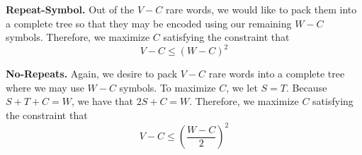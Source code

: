 \noindent\textbf{Repeat-Symbol.}
Out of the $V - C$ rare words, we would like to pack them into a complete tree
so that they may be encoded using our remaining $W - C$ symbols. Therefore, we
maximize $C$ satisfying the constraint that
$$V - C \leq (W - C)^{2}$$

\noindent\textbf{No-Repeats.}
Again, we desire to pack $V - C$ rare words into a complete tree where we may
use $W - C$ symbols. To maximize $C$, we let $S = T$. Because $S + T + C = W$,
we have that $2S + C = W$. Therefore, we maximize $C$ satisfying the constraint
that
$$V - C \leq \left(\frac{W - C}{2}\right)^{2}$$
